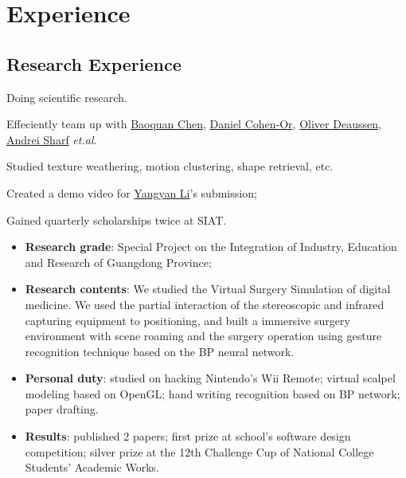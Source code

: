 \documentclass[11pt,a4paper,nolmodern]{moderncv}
\begin{document}
\section{Experience}
\subsection{Research Experience}


{Doing scientific research.
\begin{tightitemize}%
 \item Effeciently team up with \href{http://web.siat.ac.cn/~baoquan/}{Baoquan
     Chen}, \href{http://www.math.tau.ac.il/~dcor/}{Daniel Cohen-Or},
   \href{http://graphics.uni-konstanz.de/mitarbeiter/deussen.php}{Oliver
     Deaussen}, \href{http://www.idav.ucdavis.edu/~asharf/}{Andrei Sharf}
 \textsl{et.al}.
 \item Studied texture weathering, motion clustering, shape retrieval, etc.
 \item Created a demo video for \href{http://web.siat.ac.cn/~yangyan/}{Yangyan Li}'s submission;
 \item Gained quarterly scholarships twice at SIAT.
 \end{tightitemize}}

%
  {
\begin{itemize}
 \item \textbf{Research grade}: Special Project on the Integration of Industry, Education and Research of Guangdong Province;
 \item \textbf{Research contents}: We studied the Virtual Surgery Simulation of digital
   medicine. We used the partial interaction of the stereoscopic and infrared
   capturing equipment to positioning, and built a immersive surgery environment
   with scene roaming and the surgery operation using gesture recognition technique based on the BP neural network.
 \item \textbf{Personal duty}: studied on hacking Nintendo's Wii Remote; virtual scalpel
   modeling based on OpenGL; hand writing recognition based on BP network; paper
   drafting.
 \item \textbf{Results}: published 2 papers; first prize at school's software design
   competition; silver prize at the 12th Challenge Cup of National College Students' Academic Works.
\end{itemize}}
\end{document}
